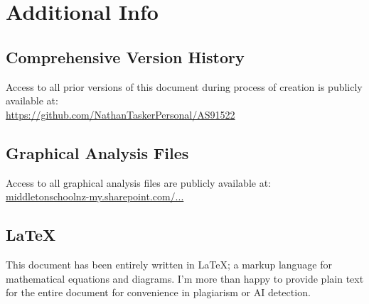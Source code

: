 \documentclass[11pt, a4paper]{article}
\begin{document}
	\section{Additional Info}
	\subsection{Comprehensive Version History}
	Access to all prior versions of this document during process of creation is publicly available at:\\
	\url{https://github.com/NathanTaskerPersonal/AS91522}
	\subsection{Graphical Analysis Files}
	Access to all graphical analysis files are publicly available at:\\
	\href{https://middletonschoolnz-my.sharepoint.com/:f:/g/personal/taskern_middleton_school_nz/EhEmw21C2L9Fn9BYUy2ccwMBn6xCUF93vtfvtT_5_rkxbA?e=Tp02lP}{middletonschoolnz-my.sharepoint.com/...}
	\subsection{\LaTeX}
	This document has been entirely written in \LaTeX; a markup language for mathematical equations and diagrams. I'm more than happy to provide plain text for the entire document for convenience in plagiarism or AI detection.
\end{document}
